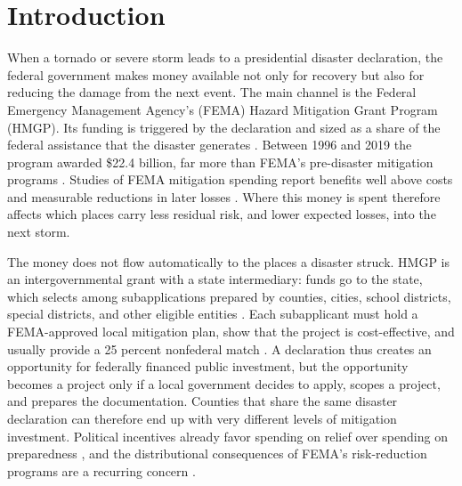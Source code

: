 \section{Introduction}
\label{sec:intro}

When a tornado or severe storm leads to a presidential disaster declaration, the federal government makes money available not only for recovery but also for reducing the damage from the next event. The main channel is the Federal Emergency Management Agency's (FEMA) Hazard Mitigation Grant Program (HMGP). Its funding is triggered by the declaration and sized as a share of the federal assistance that the disaster generates \parencite{horn2022crs}. Between 1996 and 2019 the program awarded \$22.4 billion, far more than FEMA's pre-disaster mitigation programs \parencite{horn2022crs}. Studies of FEMA mitigation spending report benefits well above costs \parencite{rose2007bca,godschalk2009foresight} and measurable reductions in later losses \parencite{davlasheridze2017adaptation,miao2025loss}. Where this money is spent therefore affects which places carry less residual risk, and lower expected losses, into the next storm.

The money does not flow automatically to the places a disaster struck. HMGP is an intergovernmental grant with a state intermediary: funds go to the state, which selects among subapplications prepared by counties, cities, school districts, special districts, and other eligible entities \parencite{horn2022crs}. Each subapplicant must hold a FEMA-approved local mitigation plan, show that the project is cost-effective, and usually provide a 25 percent nonfederal match \parencite{horn2022crs,frimpong2023federal}. A declaration thus creates an opportunity for federally financed public investment, but the opportunity becomes a project only if a local government decides to apply, scopes a project, and prepares the documentation. Counties that share the same disaster declaration can therefore end up with very different levels of mitigation investment. Political incentives already favor spending on relief over spending on preparedness \parencite{healy2009myopic}, and the distributional consequences of FEMA's risk-reduction programs are a recurring concern \parencite{noonan2018flood,miao2025equity}.

